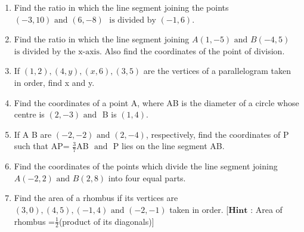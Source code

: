 \documentclass[12pt]{article}
\let\vec\mathbf
\begin{document}
\begin{enumerate}
\item Find the ratio in which the line segment joining the points $(-3,10) \text{ and } (6,-8)$ $\text{ is divided by } (-1,6)$.
\item Find the ratio in which the line segment joining $A(1,-5) \text{ and } B(-4,5)$ $\text{is divided by the x-axis}$. Also find the coordinates of the point of division.
\item If $(1,2), (4,y), (x,6), (3,5)$ are the vertices of a parallelogram taken in order, find x and y.
\item Find the coordinates of a point A, where AB is the diameter of a circle whose centre is $(2,-3) \text{ and }$ B is $(1,4)$.
\item If A  B are $(-2,-2) \text{ and } (2,-4)$, respectively, find the coordinates of P such that AP= $\frac {3}{7}$AB $\text{ and }$ P lies on the line segment AB.
\item Find the coordinates of the points which divide the line segment joining $A(-2,2) \text{ and } B(2,8)$ into four equal parts.
\item Find the area of a rhombus if its vertices are $(3,0), (4,5), (-1,4) \text{ and } (-2,-1)$ taken in order. [$\vec{Hint}$ : Area of rhombus =$\frac {1}{2}$(product of its diagonals)]

\end{enumerate}
\end{document}
